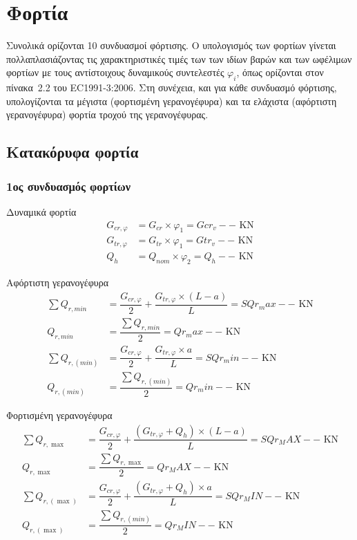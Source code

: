 \section{Φορτία}
Συνολικά ορίζονται 10 συνδυασμοί φόρτισης. Ο υπολογισμός των φορτίων γίνεται πολλαπλασιάζοντας τις χαρακτηριστικές τιμές των των ιδίων βαρών και των ωφέλιμων φορτίων με τους αντίστοιχους δυναμικούς συντελεστές $φ_i$, όπως ορίζονται στον πίνακα~2.2 του EC1991-3:2006. Στη συνέχεια, και για κάθε συνδυασμό φόρτισης, υπολογίζονται τα μέγιστα (φορτισμένη γερανογέφυρα) και τα ελάχιστα (αφόρτιστη γερανογέφυρα) φορτία τροχού της γερανογέφυρας.

\subsection{Κατακόρυφα φορτία}
\subsubsection{1ος συνδυασμός φορτίων}
Δυναμικά  φορτία
\begin{align*}
G_{cr,φ}  &= G_{cr} \times φ_1  = Gcr_v-- \text{ KN} \\
G_{tr,φ}  &= G_{tr} \times φ_1  = Gtr_v-- \text{ KN} \\
Q_h       &= Q_{nom} \times φ_2 = Q_h--   \text{ KN}
\end{align*}

Αφόρτιστη γερανογέφυρα
\begin{align*}
\sum{Q_{r,min}}   &= \dfrac{G_{cr,φ}}{2} + \dfrac{G_{tr,φ} \times (L - a)}{L} = SQr_max-- \text{ KN} \\
Q_{r,min}         &= \dfrac{\displaystyle\sum{Q_{r,min}}}{2}                  = Qr_max--  \text{ KN} \\
\sum{Q_{r,(min)}} &= \dfrac{G_{cr,φ}}{2} + \dfrac{G_{tr,φ} \times a}{L}       = SQr_min-- \text{ KN} \\
Q_{r,(min)}       &= \dfrac{\displaystyle\sum{Q_{r,(min)}}}{2}                = Qr_min--  \text{ KN}
\end{align*}

Φορτισμένη γερανογέφυρα
\begin{align*}
\sum{Q_{r,\max}}     &= \dfrac{G_{cr,φ}}{2} + \dfrac{(G_{tr,φ} + Q_h) \times (L - a)}{L}   = SQr_MAX-- \text{ KN} \\
Q_{r,\max}           &= \dfrac{\displaystyle\sum{Q_{r,\max}}}{2}                           = Qr_MAX--  \text{ KN} \\
\sum{Q_{r,(\max)}}   &= \dfrac{G_{cr,φ}}{2} + \dfrac{(G_{tr,φ} + Q_h) \times a}{L}         = SQr_MIN-- \text{ KN} \\
Q_{r,(\max)}         &= \dfrac{\displaystyle\sum{Q_{r,(min)}}}{2}                          = Qr_MIN-- \text{ KN}
\end{align*}

